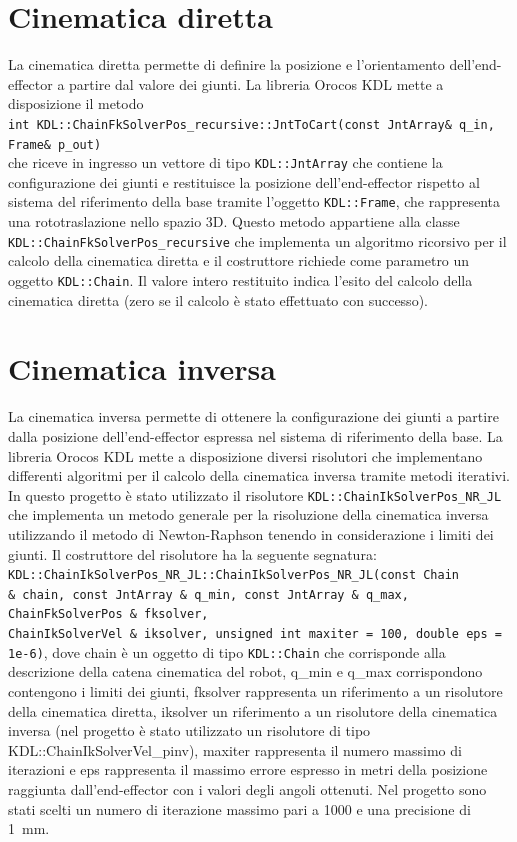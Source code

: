 \clearpage

\section{Cinematica diretta}
La cinematica diretta permette di definire la posizione e l'orientamento dell'end-effector a partire dal valore dei giunti. La libreria Orocos KDL mette a disposizione il metodo \\ \texttt{int KDL::ChainFkSolverPos\_recursive::JntToCart(const JntArray\& q\_in, Frame\& p\_out)} \\ che riceve in ingresso un vettore di tipo \texttt{KDL::JntArray} che contiene la configurazione dei giunti e restituisce la posizione dell'end-effector rispetto al sistema del riferimento della base tramite l'oggetto \texttt{KDL::Frame}, che rappresenta una rototraslazione nello spazio 3D. Questo metodo appartiene alla classe \texttt{KDL::ChainFkSolverPos\_recursive} che implementa un algoritmo ricorsivo per il calcolo della cinematica diretta e il costruttore richiede come parametro un oggetto \texttt{KDL::Chain}. Il valore intero restituito indica l'esito del calcolo della cinematica diretta (zero se il calcolo è stato effettuato con successo).

\section{Cinematica inversa}
La cinematica inversa permette di ottenere la configurazione dei giunti a partire dalla posizione dell'end-effector espressa nel sistema di riferimento della base. La libreria Orocos 
KDL mette a disposizione diversi risolutori che implementano differenti algoritmi per il calcolo della cinematica inversa tramite metodi iterativi. In questo progetto è stato utilizzato il risolutore \texttt{KDL::ChainIkSolverPos\_NR\_JL} che implementa un metodo generale per la risoluzione della cinematica inversa utilizzando il metodo di Newton-Raphson tenendo in considerazione i limiti dei giunti. Il costruttore del risolutore ha la seguente segnatura: \texttt{KDL::ChainIkSolverPos\_NR\_JL::ChainIkSolverPos\_NR\_JL(const Chain \&\ chain, const JntArray \&\ q\_min, const JntArray \&\ q\_max, ChainFkSolverPos \&\ fksolver, \\ ChainIkSolverVel \&\ iksolver, unsigned int	maxiter = 100, double eps = 1e-6)}, dove chain è un oggetto di tipo \texttt{KDL::Chain} che corrisponde alla descrizione della catena cinematica del robot, q\_min e q\_max corrispondono contengono i limiti dei giunti, fksolver rappresenta un riferimento a un risolutore della cinematica diretta, iksolver un riferimento a un risolutore della cinematica inversa (nel progetto è stato utilizzato un risolutore di tipo KDL::ChainIkSolverVel\_pinv), maxiter rappresenta il numero massimo di iterazioni e eps rappresenta il massimo errore espresso in metri della posizione raggiunta dall'end-effector con i valori degli angoli ottenuti. Nel progetto sono stati scelti un numero di iterazione massimo pari a 1000 e una precisione di \SI{1}{\milli\meter}. 

